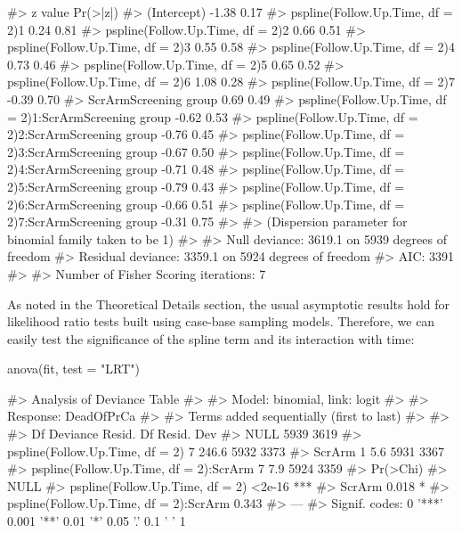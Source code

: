\begin{Schunk}
\begin{Soutput}
#>                                                        z value Pr(>|z|)
#> (Intercept)                                              -1.38     0.17
#> pspline(Follow.Up.Time, df = 2)1                          0.24     0.81
#> pspline(Follow.Up.Time, df = 2)2                          0.66     0.51
#> pspline(Follow.Up.Time, df = 2)3                          0.55     0.58
#> pspline(Follow.Up.Time, df = 2)4                          0.73     0.46
#> pspline(Follow.Up.Time, df = 2)5                          0.65     0.52
#> pspline(Follow.Up.Time, df = 2)6                          1.08     0.28
#> pspline(Follow.Up.Time, df = 2)7                         -0.39     0.70
#> ScrArmScreening group                                     0.69     0.49
#> pspline(Follow.Up.Time, df = 2)1:ScrArmScreening group   -0.62     0.53
#> pspline(Follow.Up.Time, df = 2)2:ScrArmScreening group   -0.76     0.45
#> pspline(Follow.Up.Time, df = 2)3:ScrArmScreening group   -0.67     0.50
#> pspline(Follow.Up.Time, df = 2)4:ScrArmScreening group   -0.71     0.48
#> pspline(Follow.Up.Time, df = 2)5:ScrArmScreening group   -0.79     0.43
#> pspline(Follow.Up.Time, df = 2)6:ScrArmScreening group   -0.66     0.51
#> pspline(Follow.Up.Time, df = 2)7:ScrArmScreening group   -0.31     0.75
#> 
#> (Dispersion parameter for binomial family taken to be 1)
#> 
#>     Null deviance: 3619.1  on 5939  degrees of freedom
#> Residual deviance: 3359.1  on 5924  degrees of freedom
#> AIC: 3391
#> 
#> Number of Fisher Scoring iterations: 7
\end{Soutput}
\end{Schunk}

As noted in the Theoretical Details section, the usual asymptotic
results hold for likelihood ratio tests built using case-base sampling
models. Therefore, we can easily test the significance of the spline
term and its interaction with time:

\begin{Schunk}
\begin{Sinput}
anova(fit, test = "LRT")
\end{Sinput}
\begin{Soutput}
#> Analysis of Deviance Table
#> 
#> Model: binomial, link: logit
#> 
#> Response: DeadOfPrCa
#> 
#> Terms added sequentially (first to last)
#> 
#> 
#>                                        Df Deviance Resid. Df Resid. Dev
#> NULL                                                    5939       3619
#> pspline(Follow.Up.Time, df = 2)         7    246.6      5932       3373
#> ScrArm                                  1      5.6      5931       3367
#> pspline(Follow.Up.Time, df = 2):ScrArm  7      7.9      5924       3359
#>                                        Pr(>Chi)    
#> NULL                                               
#> pspline(Follow.Up.Time, df = 2)          <2e-16 ***
#> ScrArm                                    0.018 *  
#> pspline(Follow.Up.Time, df = 2):ScrArm    0.343    
#> ---
#> Signif. codes:  0 '***' 0.001 '**' 0.01 '*' 0.05 '.' 0.1 ' ' 1
\end{Soutput}
\end{Schunk}

